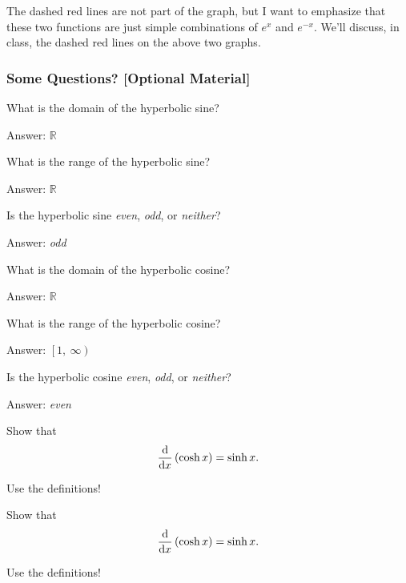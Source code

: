 \documentclass[12pt,addpoints, answers, fleqn]{exam}
\begin{document}
The dashed red lines are not part of the graph, but I want to emphasize that these two functions are just simple combinations of $e^x$ and $e^{-x}$. We'll discuss, in class, the dashed red lines on the above two graphs.

\subsubsection{Some  Questions? [Optional Material]}
\begin{questions}
\question What is the domain of the hyperbolic sine?
\begin{solution}
Answer: $\mathbb{R}$
\end{solution}


\question What is the range of the hyperbolic sine?

\begin{solution}
Answer: $\mathbb{R}$
\end{solution}

\question Is the hyperbolic sine \emph{even}, \emph{odd}, or \emph{neither}?

\begin{solution}
Answer: \emph{odd}
\end{solution}

\question What is the domain of the hyperbolic cosine?

\begin{solution}
Answer: $\mathbb{R}$
\end{solution}

\question What is the range of the hyperbolic cosine?

\begin{solution}
Answer: $\left[ 1, \ \infty \right)$
\end{solution}

\question Is the hyperbolic cosine \emph{even}, \emph{odd}, or \emph{neither}?

\begin{solution}
Answer:  \emph{even}
\end{solution}

\question Show that
\[
\frac{{\rm{d}}}{{\rm{d}}x} \left( \cosh x \right) = \sinh x.
\]

\begin{solution}
Use the definitions!
\end{solution}


\question Show that
\[
\frac{{\rm{d}}}{{\rm{d}}x} \left( \cosh x \right) = \sinh x.
\]

\begin{solution}
Use the definitions!
\end{solution}



\end{questions}
\end{document}
